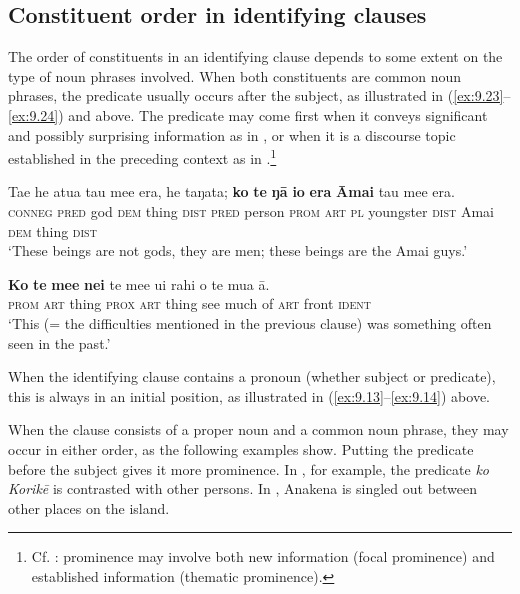 \subsection{Constituent order in identifying clauses}\label{sec:9.2.4}
The order of constituents in an identifying clause depends to some extent on the type of noun phrases involved. When both constituents are common noun phrases, the predicate usually occurs after the subject, as illustrated in (\ref{ex:9.23}–\ref{ex:9.24}) and  above. The predicate may come first when it conveys significant and possibly surprising information as in , or when it is a discourse topic established in the preceding context as in .\footnote{\label{fn:467}Cf. \citet{Levinsohn2007}: prominence may involve both new information (focal prominence) and established information (thematic prominence).}

\ea\label{ex:9.27}
\gll Ta{\ꞌ}e he {\ꞌ}atua tau me{\ꞌ}e era, he taŋata; \textbf{ko} \textbf{te} \textbf{ŋā} \textbf{io} \textbf{era} \textbf{{\ꞌ}Āmai} tau me{\ꞌ}e era.\\
\textsc{conneg} \textsc{pred} god \textsc{dem} thing \textsc{dist} \textsc{pred} person \textsc{prom} \textsc{art} \textsc{pl} youngster \textsc{dist} Amai \textsc{dem} thing \textsc{dist}\\

\glt 
‘These beings are not gods, they are men; these beings are the Amai guys.’ \textstyleExampleref{[Mtx-7-37.029]}
\z

\ea\label{ex:9.28}
\gll \textbf{Ko} \textbf{te} \textbf{me{\ꞌ}e} \textbf{nei} te me{\ꞌ}e u{\ꞌ}i rahi o te mu{\ꞌ}a {\ꞌ}ā. \\
\textsc{prom} \textsc{art} thing \textsc{prox} \textsc{art} thing see much of \textsc{art} front \textsc{ident} \\

\glt
‘This (= the difficulties mentioned in the previous clause) was something often seen in the past.’ \textstyleExampleref{[R107.009]} 
\z

When the identifying clause contains a pronoun (whether subject or predicate), this is always in an initial position, as illustrated in (\ref{ex:9.13}–\ref{ex:9.14}) above. 

When the clause consists of a proper noun and a common noun phrase, they may occur in either order, as the following examples show. Putting the predicate before the subject gives it more prominence. In , for example, the predicate \textit{ko Korikē} is contrasted with other persons. In , Anakena is singled out between other places on the island.

